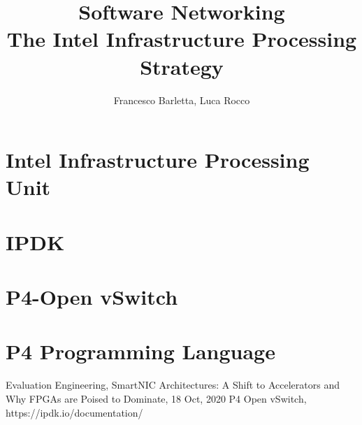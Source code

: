 \documentclass{article}
\title{
    Software Networking \\
    \large The Intel Infrastructure Processing Strategy}
\begin{document}
\author{Francesco Barletta, Luca Rocco}

\maketitle

\tableofcontents

\clearpage

\section{Intel\raisebox {1mm}{\textregistered} Infrastructure Processing Unit}


\section{IPDK}


\section{P4-Open vSwitch}


\section{P4 Programming Language}


\clearpage

\printnoidxglossary[type=acronym]
\printacronyms

\clearpage

\begin{thebibliography}{1}
    Evaluation Engineering, SmartNIC Architectures: A Shift to Accelerators and Why FPGAs are Poised to Dominate, 18 Oct, 2020
    P4 Open vSwitch, https://ipdk.io/documentation/
\end{thebibliography}
\end{document}

